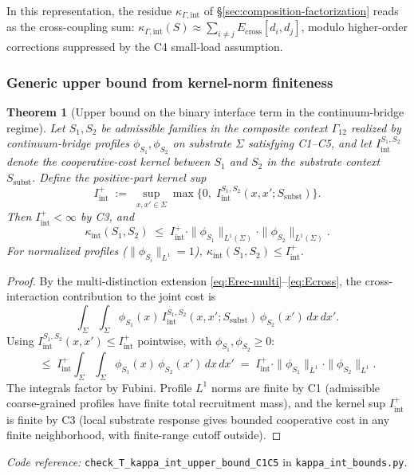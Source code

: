 \documentclass[11pt]{article}
\newtheorem{theorem}{Theorem}[section]
\newcommand{\coderef}[2]{\smallskip\noindent\textit{Code reference:} \texttt{#1} in \texttt{#2}.}
\begin{document}
In this representation, the residue $\kappa_{\Gamma,\mathrm{int}}$ of \S\ref{sec:composition-factorization} reads as the cross-coupling sum: $\kappa_{\Gamma,\mathrm{int}}(S) \approx \sum_{i\neq j} E_{\mathrm{cross}}[d_i, d_j]$, modulo higher-order corrections suppressed by the C4 small-load assumption.

\subsubsection*{Generic upper bound from kernel-norm finiteness}

\begin{theorem}[Upper bound on the binary interface term in the continuum-bridge regime]\label{thm:kappa-int-binary-upper-bound}
Let $S_1, S_2$ be admissible families in the composite context $\Gamma_{12}$ realized by continuum-bridge profiles $\phi_{S_1}, \phi_{S_2}$ on substrate $\Sigma$ satisfying C1--C5, and let $I_{\mathrm{int}}^{S_1, S_2}$ denote the cooperative-cost kernel between $S_1$ and $S_2$ in the substrate context $S_{\mathrm{subst}}$.  Define the positive-part kernel sup
\[
    I_{\mathrm{int}}^+ \;:=\; \sup_{x, x'\in\Sigma} \max\bigl\{0,\; I_{\mathrm{int}}^{S_1, S_2}(x, x'; S_{\mathrm{subst}})\bigr\}.
\]
Then $I_{\mathrm{int}}^+ < \infty$ by C3, and
\[
    \kappa_{\mathrm{int}}(S_1, S_2)
    \;\le\;
    I_{\mathrm{int}}^+ \cdot \|\phi_{S_1}\|_{L^1(\Sigma)} \cdot \|\phi_{S_2}\|_{L^1(\Sigma)}.
\]
For normalized profiles ($\|\phi_{S_i}\|_{L^1} = 1$), $\kappa_{\mathrm{int}}(S_1, S_2) \le I_{\mathrm{int}}^+$.
\end{theorem}
\begin{proof}
By the multi-distinction extension \eqref{eq:Erec-multi}--\eqref{eq:Ecross}, the cross-interaction contribution to the joint cost is
\[
    \int_\Sigma\!\!\int_\Sigma \phi_{S_1}(x)\,
    I_{\mathrm{int}}^{S_1, S_2}(x, x'; S_{\mathrm{subst}})\,
    \phi_{S_2}(x') \, dx \, dx'.
\]
Using $I_{\mathrm{int}}^{S_1, S_2}(x, x') \le I_{\mathrm{int}}^+$ pointwise, with $\phi_{S_1}, \phi_{S_2} \ge 0$:
\[
    \le \;
    I_{\mathrm{int}}^+ \int_\Sigma\!\!\int_\Sigma \phi_{S_1}(x)\,\phi_{S_2}(x') \, dx \, dx'
    \;=\;
    I_{\mathrm{int}}^+ \cdot \|\phi_{S_1}\|_{L^1} \cdot \|\phi_{S_2}\|_{L^1}.
\]
The integrals factor by Fubini.  Profile $L^1$ norms are finite by C1 (admissible coarse-grained profiles have finite total recruitment mass), and the kernel sup $I_{\mathrm{int}}^+$ is finite by C3 (local substrate response gives bounded cooperative cost in any finite neighborhood, with finite-range cutoff outside).
\end{proof}
\coderef{check\_T\_kappa\_int\_upper\_bound\_C1C5}{kappa\_int\_bounds.py}
\end{document}
